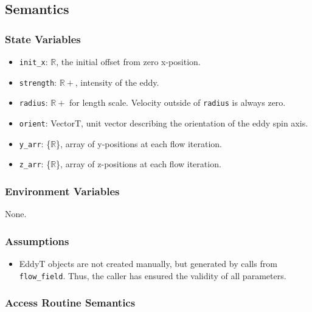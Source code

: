 \documentclass[12pt, titlepage]{article}
\begin{document}
\subsection{Semantics}

\subsubsection{State Variables}
\begin{itemize}
  \item \texttt{init\_x}: $\mathbb{R}$, the initial offset from zero x-position.
  \item \texttt{strength}: $\mathbb{R+}$, intensity of the eddy.
  \item \texttt{radius}: $\mathbb{R+}$ for length scale. Velocity outside of \texttt{radius} is always zero.
  \item \texttt{orient}: VectorT, unit vector describing the orientation of the eddy spin axis.
  \item \texttt{y\_arr}: \{$\mathbb{R}$\}, array of y-positions at each flow iteration.
  \item \texttt{z\_arr}: \{$\mathbb{R}$\}, array of z-positions at each flow iteration.
\end{itemize}

\subsubsection{Environment Variables}
None.

\subsubsection{Assumptions}
\begin{itemize}
  \item EddyT objects are not created manually, but generated by calls from \texttt{flow\_field}. Thus, the caller has ensured the validity of all parameters.
\end{itemize}

\subsubsection{Access Routine Semantics}
\end{document}
